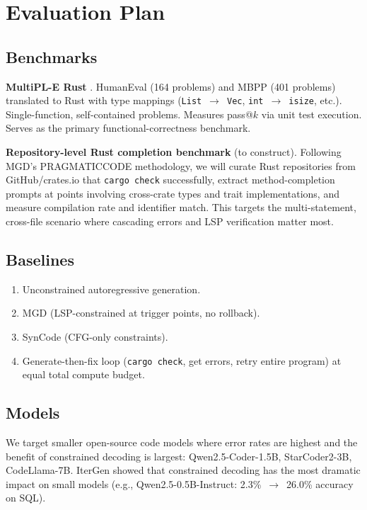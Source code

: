 \documentclass[11pt,letterpaper]{article}
\begin{document}
\section{Evaluation Plan}

\subsection{Benchmarks}

\textbf{MultiPL-E Rust} \citep{cassano2023multiple}. HumanEval (164 problems) and MBPP (401 problems) translated to Rust with type mappings (\texttt{List}~$\to$~\texttt{Vec}, \texttt{int}~$\to$~\texttt{isize}, etc.). Single-function, self-contained problems. Measures pass@$k$ via unit test execution. Serves as the primary functional-correctness benchmark.

\textbf{Repository-level Rust completion benchmark} (to construct). Following MGD's PRAGMATICCODE methodology, we will curate Rust repositories from GitHub/crates.io that \texttt{cargo check} successfully, extract method-completion prompts at points involving cross-crate types and trait implementations, and measure compilation rate and identifier match. This targets the multi-statement, cross-file scenario where cascading errors and LSP verification matter most.

\subsection{Baselines}
\begin{enumerate}[leftmargin=*,itemsep=2pt]
  \item Unconstrained autoregressive generation.
  \item MGD (LSP-constrained at trigger points, no rollback).
  \item SynCode (CFG-only constraints).
  \item Generate-then-fix loop (\texttt{cargo check}, get errors, retry entire program) at equal total compute budget.
\end{enumerate}

\subsection{Models}

We target smaller open-source code models where error rates are highest and the benefit of constrained decoding is largest: Qwen2.5-Coder-1.5B, StarCoder2-3B, CodeLlama-7B. IterGen showed that constrained decoding has the most dramatic impact on small models (e.g., Qwen2.5-0.5B-Instruct: 2.3\%~$\to$~26.0\% accuracy on SQL).
\end{document}
